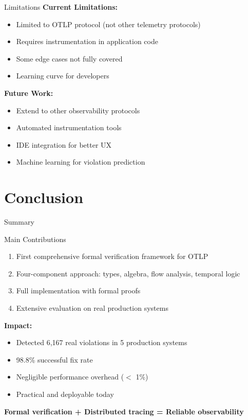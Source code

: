 \documentclass[aspectratio=169,xcolor=dvipsnames]{beamer}
\begin{document}
\begin{frame}{Limitations}
\textbf{Current Limitations:}
\begin{itemize}
    \item Limited to OTLP protocol (not other telemetry protocols)
    \item Requires instrumentation in application code
    \item Some edge cases not fully covered
    \item Learning curve for developers
\end{itemize}

\vspace{1em}
\textbf{Future Work:}
\begin{itemize}
    \item Extend to other observability protocols
    \item Automated instrumentation tools
    \item IDE integration for better UX
    \item Machine learning for violation prediction
\end{itemize}
\end{frame}

\section{Conclusion}

\begin{frame}{Summary}
\begin{block}{Main Contributions}
\begin{enumerate}
    \item First comprehensive formal verification framework for OTLP
    \item Four-component approach: types, algebra, flow analysis, temporal logic
    \item Full implementation with formal proofs
    \item Extensive evaluation on real production systems
\end{enumerate}
\end{block}

\vspace{1em}
\textbf{Impact:}
\begin{itemize}
    \item Detected 6,167 real violations in 5 production systems
    \item 98.8\% successful fix rate
    \item Negligible performance overhead ($<$ 1\%)
    \item Practical and deployable today
\end{itemize}

\vspace{1em}
\begin{center}
\textbf{\large Formal verification + Distributed tracing = Reliable observability}
\end{center}
\end{frame}
\end{document}
